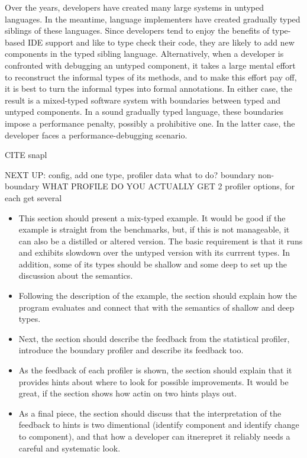 
Over the years, developers have created many large systems in untyped languages.
In the meantime, language implementers have created gradually typed siblings of
these languages.  Since developers tend to enjoy the benefits of type-based IDE
support and like to type check their code, they are likely to add new components
in the typed sibling language. Alternatively, when a developer is confronted
with debugging an untyped component, it takes a large mental effort to
reconstruct the informal types of its methods, and to make this effort pay off,
it is best to turn the informal types into formal annotations. In either case,
the result is a mixed-typed software system with boundaries between typed and
untyped components. In a sound gradually typed language, these boundaries impose
a performance penalty, possibly a prohibitive one. In the latter case, the
developer faces a performance-debugging scenario.

CITE snapl

NEXT UP: config, add one type, profiler data what to do?
 boundary non-boundary
 WHAT PROFILE DO YOU ACTUALLY GET
 2 profiler options, for each get several

\begin{itemize}
  \item This section should present a mix-typed example. It would be good
    if the example is straight from the benchmarks, but, if this is not
    manageable, it can also be a distilled or altered version.  The basic
    requirement is that it runs and exhibits slowdown over the untyped
    version with its currrent types. In addition, some of its types should
    be shallow and some deep to set up the discussion about the
    semantics.
  \item Following the description of the example,  
    the section should explain how the program evaluates and connect that with the
    semantics of shallow and deep types. 
  \item Next, the section should describe the feedback from the statistical
    profiler, introduce the boundary profiler  and 
    describe its feedback too. 
  \item As the feedback of each profiler is shown, the section should 
    explain that it provides hints about where to look for
    possible improvements. It would be great, if the section shows how
    actin on two hints plays out.  
  \item As a final piece, the section should discuss that the
    interpretation
    of the feedback to hints is two dimentional (identify component and
    identify change to component), and that how a developer can itnerepret
    it reliably needs a careful and systematic look.
\end{itemize}


